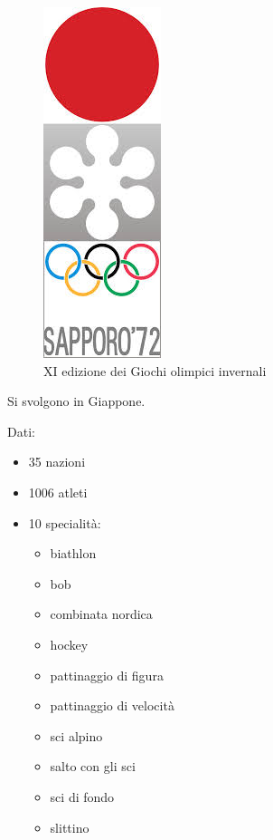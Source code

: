 \documentclass[
]{book}
\providecommand{\tightlist}{%
  \setlength{\itemsep}{0pt}\setlength{\parskip}{0pt}}
\begin{document}
\begin{figure}
\includegraphics[height=0.4\textheight]{images/loghi/1972} \caption{XI edizione dei Giochi olimpici invernali}\label{fig:unnamed-chunk-34}
\end{figure}

Si svolgono in Giappone.

Dati:

\begin{itemize}
\tightlist
\item
  35 nazioni
\item
  1006 atleti
\item
  10 specialità:

  \begin{itemize}
  \tightlist
  \item
    biathlon
  \item
    bob
  \item
    combinata nordica
  \item
    hockey
  \item
    pattinaggio di figura
  \item
    pattinaggio di velocità
  \item
    sci alpino
  \item
    salto con gli sci
  \item
    sci di fondo
  \item
    slittino
  \end{itemize}
\end{itemize}
\end{document}
